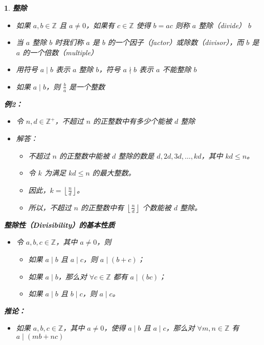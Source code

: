 \documentclass[UTF8]{report}
\theoremstyle{MyLineTheoremStyle} %
\theoremstyle{MyBlockTheoremStyle} %
\theoremstyle{MySubsubsectionStyle} %
\newtheorem{definition}{}
\begin{document}
\begin{definition}
    \textbf{整除}
    \begin{itemize}
        \item 如果 $a, b \in \mathbb{Z}$ 且 $a \neq 0$，如果有 $c \in \mathbb{Z}$ 使得 $b = ac$ 则称 $a$ 整除（divide） $b$
        \item 当 $a$ 整除 $b$ 时我们称 $a$ 是 $b$ 的一个因子（factor）或除数（divisor），而 $b$ 是 $a$ 的一个倍数（multiple）
        \item 用符号 $a \mid b$ 表示 $a$ 整除 $b$，符号 $a \nmid b$ 表示 $a$ 不能整除 $b$
        \item 如果 $a \mid b$，则 $\frac{b}{a}$ 是一个整数
    \end{itemize}

    \textbf{例2：}
    \begin{itemize}
        \item 令 $n, d \in \mathbb{Z}^+$，不超过 $n$ 的正整数中有多少个能被 $d$ 整除
        \item 解答：
        \begin{itemize}
            \item 不超过 $n$ 的正整数中能被 $d$ 整除的数是 $d, 2d, 3d, \ldots, kd$，其中 $kd \leq n$。
            \item 令 $k$ 为满足 $kd \leq n$ 的最大整数。
            \item 因此，$k = \left\lfloor \frac{n}{d} \right\rfloor$。
            \item 所以，不超过 $n$ 的正整数中有 $\left\lfloor \frac{n}{d} \right\rfloor$ 个数能被 $d$ 整除。
        \end{itemize}
    \end{itemize}

    \textbf{整除性（Divisibility）的基本性质}
    \begin{itemize}
        \item 令 $a, b, c \in \mathbb{Z}$，其中 $a \neq 0$，则
        \begin{itemize}
            \item 如果 $a \mid b$ 且 $a \mid c$，则 $a \mid (b + c)$；
            \item 如果 $a \mid b$，那么对 $\forall c \in \mathbb{Z}$ 都有 $a \mid (bc)$；
            \item 如果 $a \mid b$ 且 $b \mid c$，则 $a \mid c$。
        \end{itemize}
    \end{itemize}

    \textbf{推论：}
    \begin{itemize}
        \item 如果 $a, b, c \in \mathbb{Z}$，其中 $a \neq 0$，使得 $a \mid b$ 且 $a \mid c$，那么对 $\forall m, n \in \mathbb{Z}$ 有 $a \mid (mb + nc)$
    \end{itemize}
\end{definition}
\end{document}
